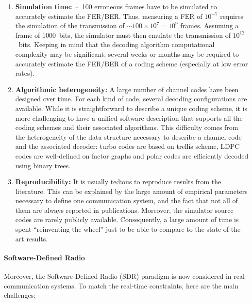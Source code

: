 \begin{enumerate}
  \item \textbf{Simulation time:}
    $\sim$ 100 erroneous frames have to be simulated to accurately estimate the
    FER/BER. Thus, measuring a FER of $10^{-7}$ requires the simulation of the
    transmission of $\sim100\times 10^7=10^9$ frames. Assuming a frame of
    1000~bits, the simulator must then emulate the transmission of
    $10^{12}$~bits. Keeping in mind that the decoding algorithm computational
    complexity may be significant, several weeks or months may be required to
    accurately estimate the FER/BER of a coding scheme (especially at low error
    rates).

  \item \textbf{Algorithmic heterogeneity:} A large number of channel codes have
    been designed over time. For each kind of code, several decoding
    configurations are available. While it is straightforward to describe a
    unique coding scheme, it is more challenging to have a unified software
    description that supports all the coding schemes and their associated
    algorithms. This difficulty comes from the heterogeneity of the data
    structure necessary to describe a channel code and the associated decoder:
    turbo codes are based on trellis scheme, LDPC codes are well-defined on
    factor graphs and polar codes are efficiently decoded using binary trees.

  \item \textbf{Reproducibility:} It is usually tedious to reproduce results
    from the literature. This can be explained by the large amount of empirical
    parameters necessary to define one communication system, and the fact that
    not all of them are always reported in publications. Moreover, the simulator
    source codes are rarely publicly available. Consequently, a large amount of
    time is spent ``reinventing the wheel'' just to be able to compare to the
    state-of-the-art results.
\end{enumerate}

\paragraph{Software-Defined Radio}

Moreover, the Software-Defined Radio (SDR) paradigm is now considered in real
communication systems. To match the real-time constraints, here are the main
challenges:

